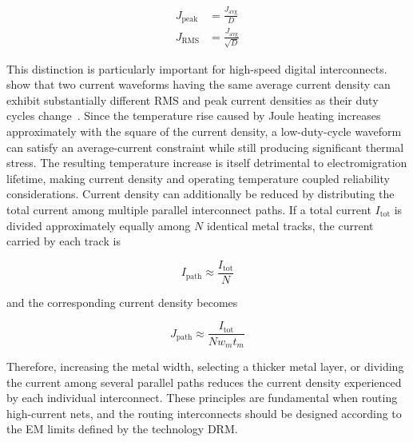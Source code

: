 \begin{align}
    J_{\mathrm{peak}} &= \frac{J_{\mathrm{avg}}}{D}
    \label{eq:em_peak_from_avg}
    \\
    J_{\mathrm{RMS}} &= \frac{J_{\mathrm{avg}}}{\sqrt{D}}
    \label{eq:em_rms_from_avg}
\end{align}


This distinction is particularly important for high-speed digital interconnects. \cite{rzepka_self_heating_1998} show that two current waveforms having the same average current density can exhibit substantially different \ac{RMS} and peak current densities as their duty cycles change~\cite{rzepka_self_heating_1998}. Since the temperature rise caused by Joule heating increases approximately with the square of the current density, a low-duty-cycle waveform can satisfy an average-current constraint while still producing significant thermal stress. The resulting temperature increase is itself detrimental to electromigration lifetime, making current density and operating temperature coupled reliability considerations.
Current density can additionally be reduced by distributing the total current among multiple parallel interconnect paths. If a total current $I_{\mathrm{tot}}$ is divided approximately equally among $N$ identical metal tracks, the current carried by each track is

\begin{equation}
    I_{\mathrm{path}} \approx \frac{I_{\mathrm{tot}}}{N}
    \label{eq:em_parallel_current}
\end{equation}

and the corresponding current density becomes

\begin{equation}
J_{\mathrm{path}} \approx \frac{I_{\mathrm{tot}}}{N w_m t_m}
\label{eq:em_parallel_density}
\end{equation}

Therefore, increasing the metal width, selecting a thicker metal layer, or dividing the current among several parallel paths reduces the current density experienced by each individual interconnect. These principles are fundamental when routing high-current nets, and the routing interconnects should be designed according to the \ac{EM} limits defined by the technology \ac{DRM}.


